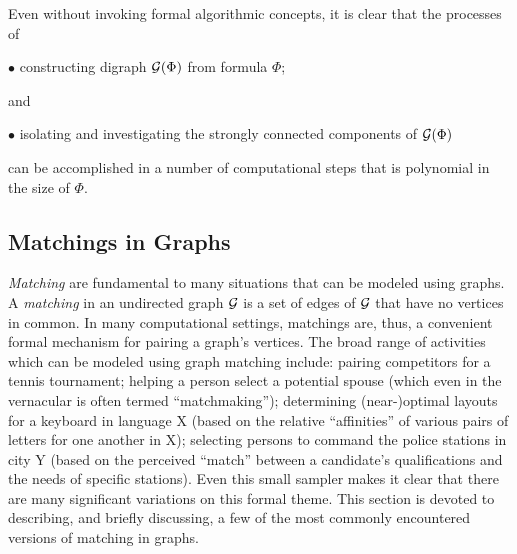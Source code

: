 \medskip

\noindent Even without invoking formal algorithmic concepts, it is clear that the processes of

\smallskip

$\bullet$ constructing digraph $\mbox{$\cal G$}(\Phi)$ from formula $\Phi$;

\noindent and

$\bullet$ isolating and investigating the strongly connected components of $\mbox{$\cal G$}(\Phi)$

\smallskip

\noindent
can be accomplished in a number of computational steps that is polynomial in the size of $\Phi$.  



\subsection{Matchings in Graphs}

{\it Matching} are fundamental to many situations that can be modeled using graphs.  A {\it matching} in an undirected graph $\mbox{$\cal G$}$ is a set of edges of $\mbox{$\cal G$}$ that have no vertices in common.  In many computational settings, matchings are, thus, a convenient formal mechanism for pairing a graph's vertices.  The broad range of activities which can be modeled using graph matching
include: pairing competitors for a tennis tournament; helping a person select a potential spouse (which even in the vernacular is often termed ``matchmaking''); determining (near-)optimal layouts for a keyboard in language X (based on the relative ``affinities'' of various pairs of letters for one another in X); selecting persons to command the police stations in city Y (based on the
perceived ``match'' between a candidate's qualifications and the needs of specific stations).  Even this small sampler makes it clear that there are many significant variations on this formal theme.  This section is devoted to describing, and briefly discussing, a few of the most commonly encountered versions of matching in graphs.

\bigskip

\noindent {}
\bigskip

